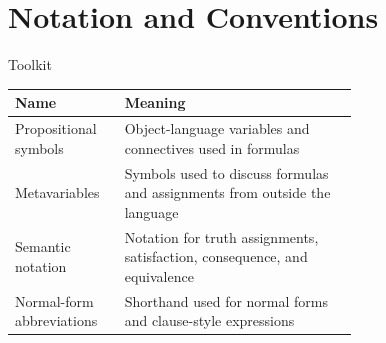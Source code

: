 \section{Notation and Conventions}

\begin{toolkitbox}{Toolkit}
\small
\begin{tabular}{l p{0.68\linewidth}}
\toprule
\textbf{Name} & \textbf{Meaning} \\
\midrule
Propositional symbols & Object-language variables and connectives used in formulas \\
Metavariables & Symbols used to discuss formulas and assignments from outside the language \\
Semantic notation & Notation for truth assignments, satisfaction, consequence, and equivalence \\
Normal-form abbreviations & Shorthand used for normal forms and clause-style expressions \\
\bottomrule
\end{tabular}
\end{toolkitbox}





